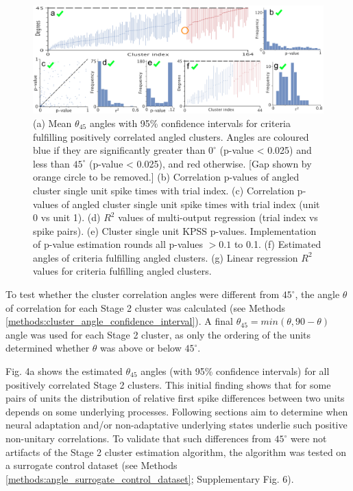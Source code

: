 \documentclass{article}
\begin{document}


\begin{figure}[t!]
\centering
\includegraphics[width=\textwidth]{Figure4.pdf}
\caption{(a) Mean $\theta_{45}$ angles with 95\% confidence intervals for criteria fulfilling positively correlated angled clusters. Angles are coloured blue if they are significantly greater than $0^{\circ}$ (p-value < 0.025) and less than $45^{\circ}$ (p-value < 0.025), and red otherwise. [Gap shown by orange circle to be removed.] (b) Correlation p-values of angled cluster single unit spike times with trial index. (c) Correlation p-values of angled cluster single unit spike times with trial index (unit 0 vs unit 1). (d) $R^2$ values of multi-output regression (trial index vs spike pairs). (e) Cluster single unit KPSS p-values. Implementation of p-value estimation rounds all p-values $>0.1$ to 0.1. (f) Estimated angles of criteria fulfilling angled clusters. (g) Linear regression $R^2$ values for criteria fulfilling angled clusters.}
\label{fig:universe}
\end{figure}


To test whether the cluster correlation angles were different from $45^{\circ}$, the angle $\theta$ of correlation for each Stage 2 cluster was calculated (see Methods \ref{methods:cluster_angle_confidence_interval}). A final $\theta_{45} = min(\theta, 90-\theta)$ angle was used for each Stage 2 cluster, as only the ordering of the units determined whether $\theta$ was above or below $45^{\circ}$.

Fig. 4a shows the estimated $\theta_{45}$ angles (with 95\% confidence intervals) for all positively correlated Stage 2 clusters.
This initial finding shows that for some pairs of units the distribution of relative first spike differences between two units depends on some underlying processes.
Following sections aim to determine when neural adaptation and/or non-adaptative underlying states underlie such positive non-unitary correlations. 
To validate that such differences from $45^{\circ}$ were not artifacts of the Stage 2 cluster estimation algorithm, the algorithm was tested on a surrogate control dataset (see Methods \ref{methods:angle_surrogate_control_dataset}; Supplementary Fig. 6). 
\end{document}

